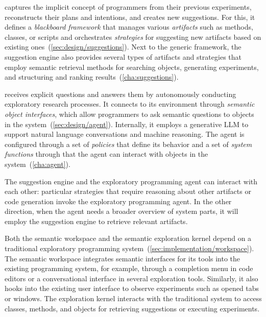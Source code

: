 \begin{description}[noextralabelsep]
	\item[The suggestion engine] captures the implicit concept of programmers from their previous experiments, reconstructs their plans and intentions, and creates new suggestions.
	For this, it defines a \emph{blackboard framework} that manages various \emph{artifacts} such as methods, classes, or scripts and orchestrates \emph{strategies} for suggesting new artifacts based on existing ones~(\cref{sec:design/suggestions}).
	Next to the generic framework, the suggestion engine also provides several types of artifacts and strategies that employ semantic retrieval methods for searching objects, generating experiments, and structuring and ranking results~(\cref{cha:suggestions}).
	\item[The exploratory programming agent] receives explicit questions and answers them by autonomously conducting exploratory research processes.
	It connects to its environment through \emph{semantic object interfaces}, which allow programmers to ask semantic questions to objects in the system~(\cref{sec:design/agent}).
	Internally, it employs a generative LLM to support natural language conversations and machine reasoning. %
	The agent is configured through a set of \emph{policies} that define its behavior and a set of \emph{system functions} through that the agent can interact with objects in the system~(\cref{cha:agent}).
\end{description}

The suggestion engine and the exploratory programming agent can interact with each other:
particular strategies that require reasoning about other artifacts or code generation invoke the exploratory programming agent.
In the other direction, when the agent needs a broader overview of system parts, it will employ the suggestion engine to retrieve relevant artifacts.

Both the semantic workspace and the semantic exploration kernel depend on a traditional exploratory programming system~(\cref{sec:implementation/workspace}).
The semantic workspace integrates semantic interfaces for its tools into the existing programming system, for example, through a completion menu in code editors or a conversational interface in several exploration tools.
Similarly, it also hooks into the existing user interface to observe experiments such as opened tabs or windows.
The exploration kernel interacts with the traditional system to access classes, methods, and objects for retrieving suggestions or executing experiments.

